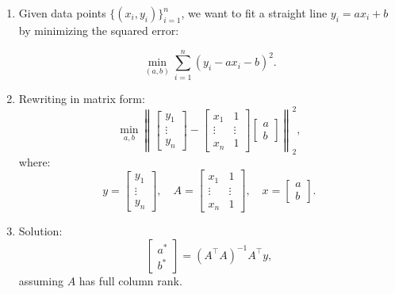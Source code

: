 \begin{example}
    \begin{enumerate}
        \item Given data points \( \{(x_i, y_i)\}_{i=1}^n \), we want to fit a straight line \( y_i = ax_i + b \) by minimizing the squared error:

        \[
        \min_{(a, b)} \sum_{i=1}^n (y_i - ax_i - b)^2.
        \]

    
        \item Rewriting in matrix form:
        \[
        \min_{a, b} \left\| 
        \begin{bmatrix}
        y_1 \\ 
        \vdots \\ 
        y_n
        \end{bmatrix}
        - 
        \begin{bmatrix}
        x_1 & 1 \\ 
        \vdots & \vdots \\ 
        x_n & 1
        \end{bmatrix}
        \begin{bmatrix}
        a \\ 
        b
        \end{bmatrix}
        \right\|_2^2,
        \]
        where:
        \[
        y = \begin{bmatrix}
        y_1 \\ 
        \vdots \\ 
        y_n
        \end{bmatrix}, \quad
        A = \begin{bmatrix}
        x_1 & 1 \\ 
        \vdots & \vdots \\ 
        x_n & 1
        \end{bmatrix}, \quad
        x = \begin{bmatrix}
        a \\ 
        b
        \end{bmatrix}.
        \]
    
        \item Solution:
        \[
        \begin{bmatrix}
        a^* \\ 
        b^*
        \end{bmatrix}
        = (A^\top A)^{-1} A^\top y,
        \]
        assuming \( A \) has full column rank.
    

\end{enumerate}
\end{example}
